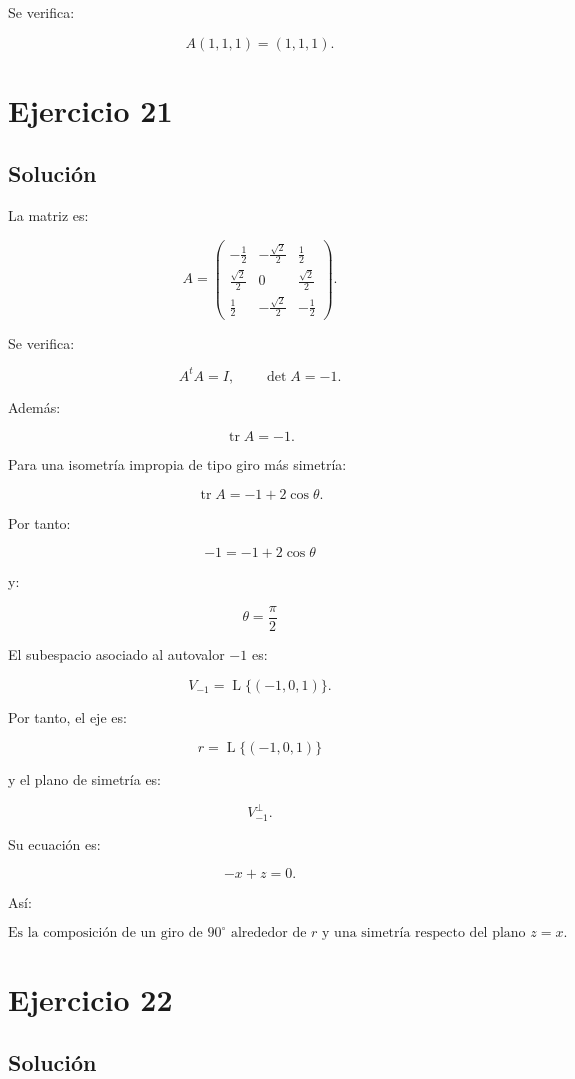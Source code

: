 \documentclass[11pt,a4paper]{article}
\newcommand{\tr}{\operatorname{tr}}
\newcommand{\Span}{\operatorname{L}}
\begin{document}
Se verifica:

\[
A(1,1,1)=(1,1,1).
\]

\section{Ejercicio 21}
\subsection{Solución}

La matriz es:

\[
A=
\begin{pmatrix}
-\frac12&-\frac{\sqrt2}{2}&\frac12\\[1mm]
\frac{\sqrt2}{2}&0&\frac{\sqrt2}{2}\\[1mm]
\frac12&-\frac{\sqrt2}{2}&-\frac12
\end{pmatrix}.
\]

Se verifica:

\[
A^tA=I,
\qquad
\det A=-1.
\]

Además:

\[
\tr A=-1.
\]

Para una isometría impropia de tipo giro más simetría:

\[
\tr A
=
-1+2\cos\theta.
\]

Por tanto:

\[
-1=-1+2\cos\theta
\]

y:

\[
\boxed{
\theta=\frac{\pi}{2}
}
\]

El subespacio asociado al autovalor \(-1\) es:

\[
V_{-1}
=
\Span\{(-1,0,1)\}.
\]

Por tanto, el eje es:

\[
\boxed{
r=\Span\{(-1,0,1)\}
}
\]

y el plano de simetría es:

\[
V_{-1}^\perp.
\]

Su ecuación es:

\[
-x+z=0.
\]

Así:

\[
\boxed{
\text{Es la composición de un giro de }90^\circ
\text{ alrededor de }r
\text{ y una simetría respecto del plano }z=x.
}
\]

\section{Ejercicio 22}
\subsection{Solución}
\end{document}
